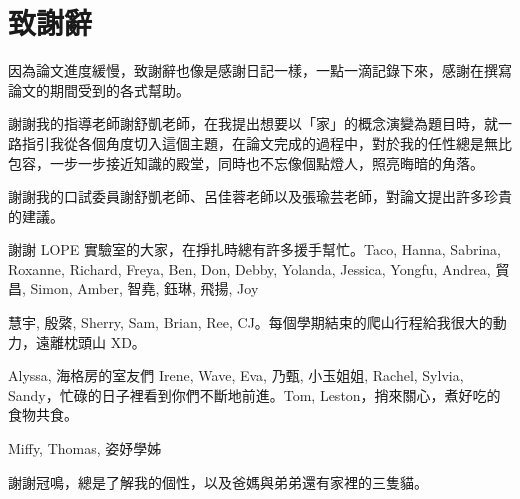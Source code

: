 

\chapter*{致謝辭}
因為論文進度緩慢，致謝辭也像是感謝日記一樣，一點一滴記錄下來，感謝在撰寫論文的期間受到的各式幫助。

謝謝我的指導老師謝舒凱老師，在我提出想要以「家」的概念演變為題目時，就一路指引我從各個角度切入這個主題，在論文完成的過程中，對於我的任性總是無比包容，一步一步接近知識的殿堂，同時也不忘像個點燈人，照亮晦暗的角落。

謝謝我的口試委員謝舒凱老師、呂佳蓉老師以及張瑜芸老師，對論文提出許多珍貴的建議。

謝謝 LOPE 實驗室的大家，在掙扎時總有許多援手幫忙。Taco, Hanna, Sabrina, Roxanne, Richard, Freya, Ben, Don, Debby, Yolanda, Jessica, Yongfu, Andrea, 貿昌, Simon, Amber, 智堯, 鈺琳, 飛揚, Joy

慧宇, 殷綮, Sherry, Sam, Brian, Ree, CJ。每個學期結束的爬山行程給我很大的動力，遠離枕頭山 XD。

Alyssa, 海格房的室友們 Irene, Wave, Eva, 乃甄, 小玉姐姐, Rachel, Sylvia, Sandy，忙碌的日子裡看到你們不斷地前進。Tom, Leston，捎來關心，煮好吃的食物共食。

Miffy, Thomas, 姿妤學姊


謝謝冠鳴，總是了解我的個性，以及爸媽與弟弟還有家裡的三隻貓。

